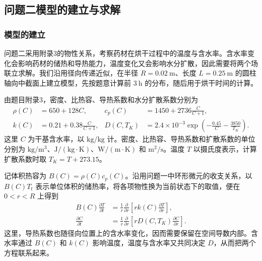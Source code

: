 \documentclass[UTF8,a4paper]{ctexart}
\begin{document}
\subsection{问题二模型的建立与求解}
\label{sec:q2}

\subsubsection{模型的建立}
\label{sec:q2-model}

问题二采用附录3的物性关系，考察药材在烘干过程中的温度与含水率。含水率变化会影响药材的储热和导热能力，温度变化又会影响水分扩散，因此需要将两个场联立求解。我们沿用径向传递近似，在半径 \(R=0.02~\mathrm m\)、长度 \(L=0.25~\mathrm m\) 的圆柱轴向中截面上建立模型，先按题意计算前 \(3~\mathrm h\) 的分布，随后用于烘干时间的计算。

由题目附录3，密度、比热容、导热系数和水分扩散系数分别为
\begin{equation}
\begin{aligned}
\rho(C)&=650+128C,&
c_p(C)&=1450+2736\frac{C}{C+1},\\
k(C)&=0.21+0.38\frac{C}{C+1},&
D(C,T_K)&=2.4\times10^{-3}
  \exp\!\left(-\frac{0.45}{C}-\frac{3850}{T_K}\right).
\end{aligned}
\label{eq:q2-properties}
\end{equation}
这里 \(C\) 为干基含水率，以 \(\mathrm{kg/kg}\) 计。密度、比热容、导热系数和扩散系数的单位分别为 \(\mathrm{kg/m^3}\)、\(\mathrm{J/(kg\cdot K)}\)、\(\mathrm{W/(m\cdot K)}\) 和 \(\mathrm{m^2/s}\)。温度 \(T\) 以摄氏度表示，计算扩散系数时取 \(T_K=T+273.15\)。

记体积热容为 \(B(C)=\rho(C)c_p(C)\)。沿用问题一中环形微元的收支关系，以 \(B(C)T_t\) 表示单位体积的储热率，将各项物性换为当前状态下的取值，便在 \(0<r<R\) 上得到
\begin{equation}
\begin{aligned}
B(C)\frac{\partial T}{\partial t}
 &=\frac{1}{r}\frac{\partial}{\partial r}
   \left[rk(C)\frac{\partial T}{\partial r}\right],\\
\frac{\partial C}{\partial t}
 &=\frac{1}{r}\frac{\partial}{\partial r}
   \left[rD(C,T_K)\frac{\partial C}{\partial r}\right].
\end{aligned}
\label{eq:q2-pde}
\end{equation}
这里，导热系数也随径向位置上的含水率变化，因而需要保留在空间导数内部。含水率通过 \(B(C)\) 和 \(k(C)\) 影响温度，温度与含水率又共同决定 \(D\)，从而把两个方程联系起来。
\end{document}
